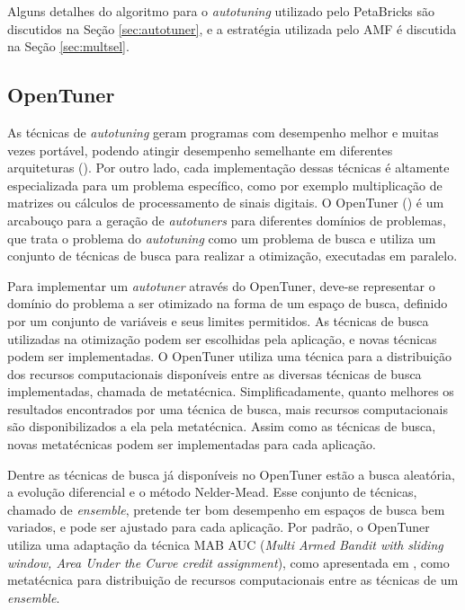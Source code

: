 \documentclass[a4paper, 11pt]{article}
\begin{document}
Alguns detalhes do algoritmo para o \emph{autotuning} utilizado pelo PetaBricks
são discutidos na Seção \ref{sec:autotuner}, e a estratégia utilizada pelo AMF
é discutida na Seção \ref{sec:multsel}.

\subsection{OpenTuner}

As técnicas de \emph{autotuning} geram programas com desempenho melhor e 
muitas vezes portável, podendo atingir desempenho semelhante em diferentes 
arquiteturas (\citet{demmel2009accelerating}). Por outro lado, cada 
implementação dessas técnicas é altamente especializada para um problema 
específico, como por exemplo multiplicação de matrizes ou cálculos de 
processamento de sinais digitais.
O OpenTuner (\citet{ansel2013opentuner}) é um arcabouço para a geração de 
\emph{autotuners} para diferentes domínios de problemas, que trata o problema
do \emph{autotuning} como um problema de busca e utiliza um conjunto de 
técnicas de busca para realizar a otimização, executadas em paralelo.

Para implementar um \emph{autotuner} através do OpenTuner, deve-se representar
o domínio do problema a ser otimizado na forma de um espaço de busca, definido 
por um conjunto de variáveis e seus limites permitidos. As técnicas de busca 
utilizadas na otimização podem ser escolhidas pela aplicação, e novas técnicas
podem ser implementadas. O OpenTuner utiliza uma técnica para a 
distribuição dos recursos computacionais disponíveis entre as 
diversas técnicas de busca implementadas, chamada de metatécnica.
Simplificadamente, quanto melhores os resultados encontrados por uma técnica de
busca, mais recursos computacionais são disponibilizados a ela pela 
metatécnica. Assim como as técnicas de busca, novas metatécnicas podem ser 
implementadas para cada aplicação.

Dentre as técnicas de busca já disponíveis no OpenTuner estão a busca 
aleatória, a evolução diferencial e o método Nelder-Mead. Esse conjunto
de técnicas, chamado de \emph{ensemble}, pretende ter bom desempenho em espaços
de busca bem variados, e pode ser ajustado para cada aplicação. Por padrão, o 
OpenTuner utiliza uma adaptação da técnica MAB AUC (\emph{Multi Armed Bandit 
with sliding window, Area Under the Curve credit assignment}), como apresentada
em \citet{pacula2012bandit}, como metatécnica para distribuição de recursos 
computacionais entre as técnicas de um \emph{ensemble}.
\end{document}
